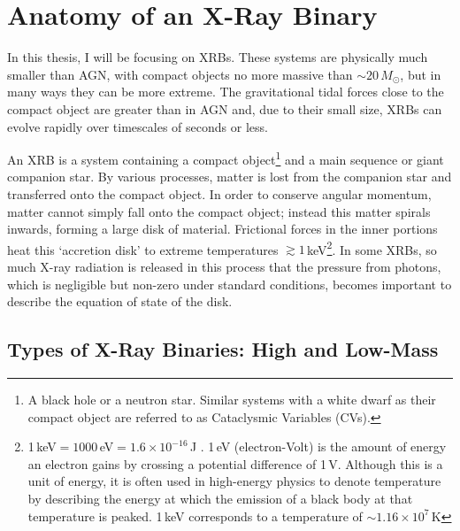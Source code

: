 \section{Anatomy of an X-Ray Binary}

\par In this thesis, I will be focusing on XRBs.  These systems are physically much smaller than AGN, with compact objects no more massive than $\sim20\,M_\odot$, but in many ways they can be more extreme.  The gravitational tidal forces close to the compact object are greater than in AGN and, due to their small size, XRBs can evolve rapidly over timescales of seconds or less.
\par An XRB is a system containing a compact object\footnote{A black hole or a neutron star.  Similar systems with a white dwarf as their compact object are referred to as Cataclysmic Variables (CVs).} and a main sequence or giant companion star.  By various processes, matter is lost from the companion star and transferred onto the compact object.  In order to conserve angular momentum, matter cannot simply fall onto the compact object; instead this matter spirals inwards, forming a large disk of material.  Frictional forces in the inner portions heat this `accretion disk' to extreme temperatures $\gtrsim1$\,keV\footnote{1\,keV$=1000$\,eV$=1.6\times10^{-16}$\,J .  1\,eV (electron-Volt) is the amount of energy an electron gains by crossing a potential difference of 1\,V.  Although this is a unit of energy, it is often used in high-energy physics to denote temperature by describing the energy at which the emission of a black body at that temperature is peaked.  1\,keV corresponds to a temperature of $\sim1.16\times10^7$\,K}.  In some XRBs, so much X-ray radiation is released in this process that the pressure from photons, which is negligible but non-zero under standard conditions, becomes important to describe the equation of state of the disk.

\subsection{Types of X-Ray Binaries: High and Low-Mass}

